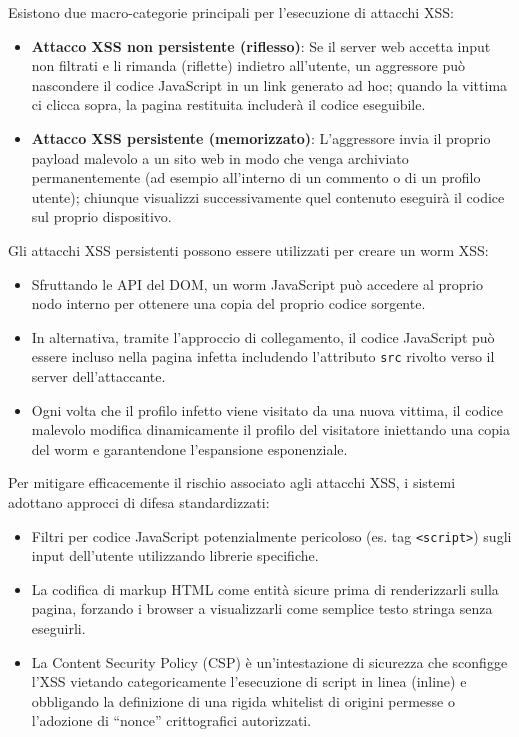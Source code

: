 \documentclass{article}
\begin{document}
Esistono due macro-categorie principali per l'esecuzione di attacchi XSS:
\begin{itemize}
    \item \textbf{Attacco XSS non persistente (riflesso)}: Se il server web accetta input non filtrati e li rimanda (riflette) indietro all'utente, un aggressore può nascondere il codice JavaScript in un link generato ad hoc; quando la vittima ci clicca sopra, la pagina restituita includerà il codice eseguibile.
    \item \textbf{Attacco XSS persistente (memorizzato)}: L'aggressore invia il proprio payload malevolo a un sito web in modo che venga archiviato permanentemente (ad esempio all'interno di un commento o di un profilo utente); chiunque visualizzi successivamente quel contenuto eseguirà il codice sul proprio dispositivo.
\end{itemize}

Gli attacchi XSS persistenti possono essere utilizzati per creare un worm XSS:
\begin{itemize}
    \item Sfruttando le API del DOM, un worm JavaScript può accedere al proprio nodo interno per ottenere una copia del proprio codice sorgente.
    \item In alternativa, tramite l'approccio di collegamento, il codice JavaScript può essere incluso nella pagina infetta includendo l'attributo \texttt{src} rivolto verso il server dell'attaccante.
    \item Ogni volta che il profilo infetto viene visitato da una nuova vittima, il codice malevolo modifica dinamicamente il profilo del visitatore iniettando una copia del worm e garantendone l'espansione esponenziale.
\end{itemize}

Per mitigare efficacemente il rischio associato agli attacchi XSS, i sistemi adottano approcci di difesa standardizzati:
\begin{itemize}
    \item Filtri per codice JavaScript potenzialmente pericoloso (es. tag \texttt{<script>}) sugli input dell'utente utilizzando librerie specifiche.
    \item La codifica di markup HTML come entità sicure prima di renderizzarli sulla pagina, forzando i browser a visualizzarli come semplice testo stringa senza eseguirli.
    \item La Content Security Policy (CSP) è un'intestazione di sicurezza che sconfigge l'XSS vietando categoricamente l'esecuzione di script in linea (inline) e obbligando la definizione di una rigida whitelist di origini permesse o l'adozione di ``nonce'' crittografici autorizzati.
\end{itemize}
\end{document}
